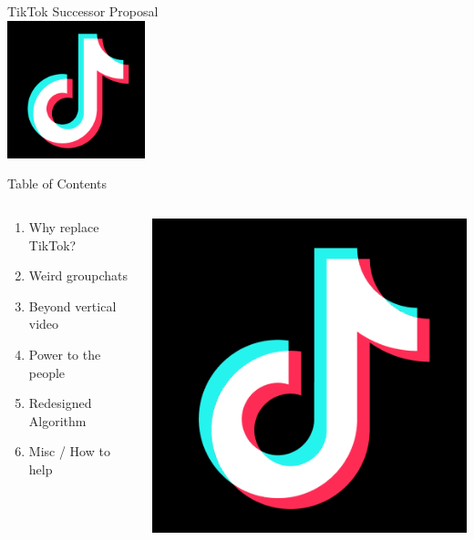 \documentclass[aspectratio=169]{beamer}
\begin{document}
\begin{frame}
    \centering
    \Huge TikTok Successor Proposal \\
\includegraphics[width=0.3\textwidth]{imgs/app_icons/tiktok-icon2.png}
\end{frame}

\begin{frame}{Table of Contents}
\begin{columns}[T]
    \begin{column}[T]{0.5\textwidth}
        \begin{enumerate}
            \item Why replace TikTok?
            \item Weird groupchats 
            \item Beyond vertical video
            \item Power to the people
            \item Redesigned Algorithm
            \item Misc / How to help
        \end{enumerate}
    \end{column}
    \begin{column}{0.5\textwidth}
        \includegraphics[height=0.8\textheight]{imgs/app_icons/tiktok-icon2.png}
    \end{column}
\end{columns}
\end{frame}
\end{document}
